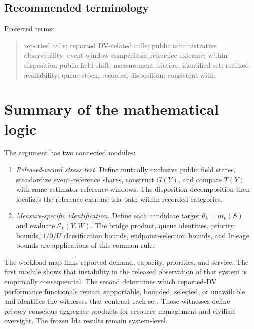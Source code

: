 \documentclass[11pt]{article}
\begin{document}
\subsection{Recommended terminology}

Preferred terms:
\begin{quote}
reported calls; reported DV-related calls; public administrative observability; event-window comparison; reference-extreme; within-disposition public field shift; measurement friction; identified set; realized availability; queue stock; recorded disposition; consistent with.
\end{quote}

\section{Summary of the mathematical logic}

The argument has two connected modules:
\begin{enumerate}
\item \emph{Released-record stress test.} Define mutually exclusive public field states, standardize event--reference shares, construct $G(Y)$, and compare $T(Y)$ with same-estimator reference windows. The disposition decomposition then localizes the reference-extreme Ida path within recorded categories.
\item \emph{Measure-specific identification.} Define each candidate target $\theta_k=m_k(S)$ and evaluate $\mathcal I_k(Y,W)$. The bridge product, queue identities, priority bounds, $1/0/U$ classification bounds, endpoint-selection bounds, and lineage bounds are applications of this common rule.
\end{enumerate}

The workload map links reported demand, capacity, priorities, and service. The first module shows that instability in the released observation of that system is empirically consequential. The second determines which reported-DV performance functionals remain supportable, bounded, selected, or unavailable and identifies the witnesses that contract each set. Those witnesses define privacy-conscious aggregate products for resource management and civilian oversight. The frozen Ida results remain system-level.



\end{document}
